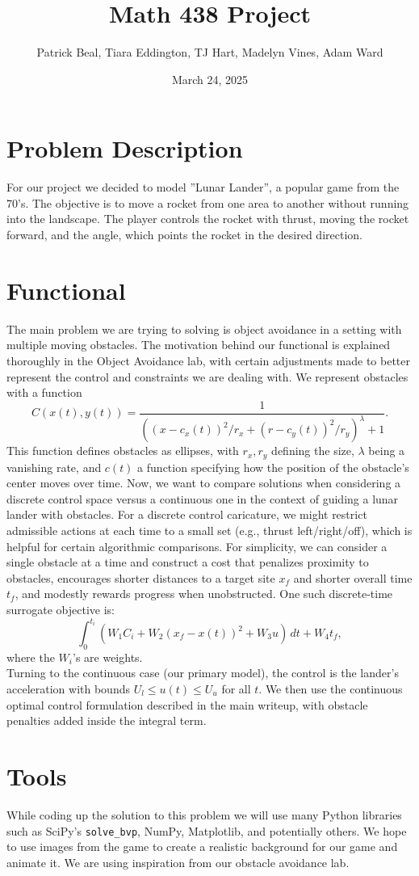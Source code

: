 \documentclass{article}
\title{Math 438 Project}
\author{Patrick Beal, Tiara Eddington, TJ Hart, Madelyn Vines, Adam Ward}
\date{March 24, 2025}
\begin{document}
\maketitle

\section{Problem Description}
For our project we decided to model ''Lunar Lander'', a popular game from the 70's. The objective is to move a rocket from one area to another without running into the landscape. The player controls the rocket with thrust, moving the rocket forward, and the angle, which points the rocket in the desired direction. 

\section{Functional}
The main problem we are trying to solving is object avoidance in a setting with multiple moving obstacles. The motivation behind our functional is explained thoroughly in the Object Avoidance lab, with certain adjustments made to better represent the control and constraints we are dealing with. We represent obstacles with a function $$C(x(t), y(t)) = \frac{1}{((x - c_x(t))^2 / r_x + (r - c_y(t))^2 / r_y)^\lambda + 1}.$$ This function defines obstacles as ellipses, with $r_x, r_y$ defining the size, $\lambda$ being a vanishing rate, and $c(t)$ a function specifying how the position of the obstacle's center moves over time.
Now, we want to compare solutions when considering a discrete control space versus a continuous one in the context of guiding a lunar lander with obstacles. For a discrete control caricature, we might restrict admissible actions at each time to a small set (e.g., thrust left/right/off), which is helpful for certain algorithmic comparisons. For simplicity, we can consider a single obstacle at a time and construct a cost that penalizes proximity to obstacles, encourages shorter distances to a target site $x_f$ and shorter overall time $t_f$, and modestly rewards progress when unobstructed. One such discrete-time surrogate objective is: $$\int_{0}^{t_i} (W_1C_i + W_2(x_f - x(t))^2 + W_3u)\,dt + W_4 t_f,$$ where the $W_i$'s are weights.
\\ Turning to the continuous case (our primary model), the control is the lander’s acceleration with bounds $U_l \leq u(t) \leq U_u$ for all $t$. We then use the continuous optimal control formulation described in the main writeup, with obstacle penalties added inside the integral term.

\section{Tools}
While coding up the solution to this problem we will use many Python libraries such as SciPy's \texttt{solve\_bvp}, NumPy, Matplotlib, and potentially others. We hope to use images from the game to create a realistic background for our game and animate it. We are using inspiration from our obstacle avoidance lab.
\end{document}
